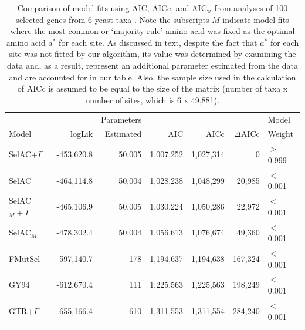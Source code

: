 \documentclass[onecolumn,letterpaper,fleqn,nogrid]{myMBE}%
\newcommand{\DeltaAICc}{\ensuremath{\Delta\text{AICc}}\xspace}
\newcommand{\AICw}{\ensuremath{\text{AIC}_\text{w}}\xspace}
\newcommand{\selac}{SelAC\xspace}
\newcommand{\selacplusgamma}{SelAC$+\Gamma$\xspace}
\newcommand{\selacmaj}{SelAC$_{M}$\xspace}
\newcommand{\selacmajplusgamma}{SelAC$_{M}+\Gamma$\xspace}
\newcommand{\aopt}{\ensuremath{a^*}\xspace}
\begin{document}
  \begin{table}[H]
    \begin{tabular}{lrrrrrl}
                                &                  &Parameters &              &              &            &    Model\\
      Model                     & logLik   & Estimated &           AIC&          AICc&  \DeltaAICc&  Weight\\\hline
      \selacplusgamma           & -453,620.8&       50,005&   1,007,252&     1,027,314&           0&          $>$0.999\\
      \selac                    & -464,114.8&       50,004&   1,028,238&     1,048,299&      20,985&          $<$0.001\\
      \selacmajplusgamma        & -465,106.9&       50,005&   1,030,224&     1,050,286&      22,972&          $<$0.001\\
      \selacmaj                 & -478,302.4&       50,004&   1,056,613&     1,076,674&      49,360&          $<$0.001\\
      FMutSel                   & -597,140.7&       178&      1,194,637&     1,194,638&     167,324&           $<$0.001\\
      GY94                      & -612,670.4&       111&      1,225,563&     1,225,563&     198,249&           $<$0.001\\
      GTR+$\Gamma$              & -655,166.4&       610&      1,311,553&     1,311,554&     284,240&        $<$0.001\\

    \end{tabular}
    \caption{Comparison of model fits using AIC, AICc, and \AICw from analyses of 100 selected genes from 6 yeast taxa \citet{SalichosAndRokas2013}.
Note the subscripts $M$ indicate model fits where the most common or `majority rule' amino acid was fixed as the optimal amino acid \aopt for each site.
As discussed in text, despite the fact that \aopt for each site was not fitted by our algorithm, its value was determined by examining the data and, as a result, represent an additional parameter estimated from the data and are accounted for in our table.
Also, the sample size used in the calculation of AICc is assumed to be equal to the size of the matrix (number of taxa x number of sites, which is 6 x 49,881).
}
    \label{table:modelFits}
\end{table}



\clearpage %
\end{document}
